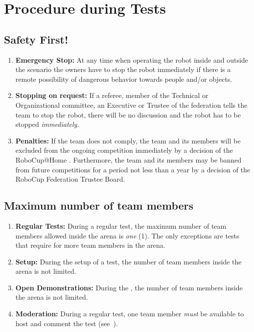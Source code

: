 \section{Procedure during Tests}

\subsection{Safety First!}
\label{rule:safetyfirst}
\begin{enumerate}
	\item \textbf{Emergency Stop:} At any time when operating the robot inside and outside the scenario the owners have to stop the robot immediately if there is a remote possibility of dangerous behavior towards people and/or objects.
	\item \textbf{Stopping on request:} If a referee, member of the Technical or Organizational committee, an Executive or Trustee of the federation tells the team to stop the robot, there will be no discussion and the robot has to be stopped \emph{immediately}.
	\item \textbf{Penalties:} If the team does not comply, the team and its members will be excluded from the ongoing competition immediately by a decision of the RoboCup@Home . 	Furthermore, the team and its members may be banned from future competitions for a period not less than a year by a decision of the RoboCup Federation Trustee Board.
\end{enumerate}

\subsection{Maximum number of team members}
\label{rule:number_of_people}
\begin{enumerate}
	\item \textbf{Regular Tests:} During a regular test, the maximum number of team members allowed inside the arena is \emph{one} (1). The only exceptions are tests that require for more team members in the arena.
	\item \textbf{Setup:} During the setup of a test, the number of team members inside the arena is not limited.
	\item \textbf{Open Demonstrations:} During the , the number of team members inside the arena is not limited.
	\item \textbf{Moderation:} During a regular test, one team member \emph{must} be available to host and comment the test (see~).
\end{enumerate}

